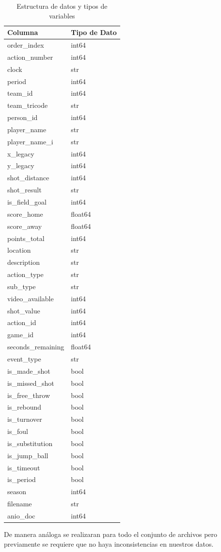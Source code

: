 \begin{table}[H]
\centering
\caption{Estructura de datos y tipos de variables}
\label{tab:variables_wnba}
\begin{tabular}{ll}
\toprule
\textbf{Columna} & \textbf{Tipo de Dato} \\
\midrule
order\_index & int64 \\
action\_number & int64 \\
clock & str \\
period & int64 \\
team\_id & int64 \\
team\_tricode & str \\
person\_id & int64 \\
player\_name & str \\
player\_name\_i & str \\
x\_legacy & int64 \\
y\_legacy & int64 \\
shot\_distance & int64 \\
shot\_result & str \\
is\_field\_goal & int64 \\
score\_home & float64 \\
score\_away & float64 \\
points\_total & int64 \\
location & str \\
description & str \\
action\_type & str \\
sub\_type & str \\
video\_available & int64 \\
shot\_value & int64 \\
action\_id & int64 \\
game\_id & int64 \\
seconds\_remaining & float64 \\
event\_type & str \\
is\_made\_shot & bool \\
is\_missed\_shot & bool \\
is\_free\_throw & bool \\
is\_rebound & bool \\
is\_turnover & bool \\
is\_foul & bool \\
is\_substitution & bool \\
is\_jump\_ball & bool \\
is\_timeout & bool \\
is\_period & bool \\
season & int64 \\
filename & str \\
anio\_doc & int64 \\
\bottomrule
\end{tabular}
\end{table}
De manera análoga se realizaran para todo el conjunto de archivos pero previamente se requiere que no haya inconsistencias en nuestros datos.